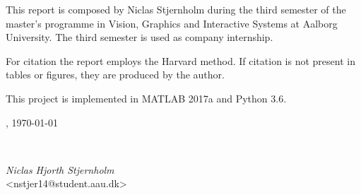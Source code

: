 This report is composed by Niclas Stjernholm during the third semester of the master's programme in Vision, Graphics and Interactive Systems at Aalborg University. The third semester is used as company internship.

For citation the report employs the Harvard method. If citation is not present in tables or figures, they are produced by the author.

This project is implemented in MATLAB 2017a and Python 3.6.

\vspace{\baselineskip}\hfill \AAU, \today
\vfill\noindent
\begin{center}
\
\begin{minipage}[b]{0.45\textwidth}
  \centering
  \textit{Niclas Hjorth Stjernholm}\\
  {\footnotesize <nstjer14@student.aau.dk>}
\end{minipage}

\end{center}
